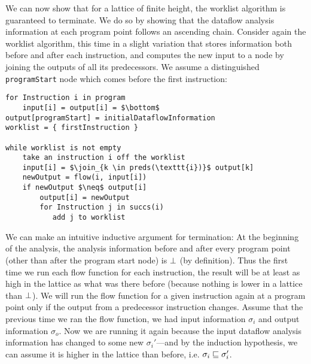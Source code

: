 \documentclass[11pt]{article}
\begin{document}


\vspace{1em}
We can now show that for a lattice of finite height, the worklist algorithm is guaranteed to terminate.  We do so by showing that the dataflow analysis information at each program point follows an ascending chain.  Consider again the worklist algorithm, this time in a slight
variation that stores information both before and after each instruction, and computes the new input to a node by joining the outputs of all its predecessors.  We assume a distinguished \texttt{programStart} node which comes before the first instruction:


\begin{lstlisting}[mathescape]
for Instruction i in program
    input[i] = output[i] = $\bottom$
output[programStart] = initialDataflowInformation
worklist = { firstInstruction }

while worklist is not empty
    take an instruction i off the worklist
    input[i] = $\join_{k \in preds(\texttt{i})}$ output[k]
    newOutput = flow(i, input[i])
    if newOutput $\neq$ output[i]
        output[i] = newOutput
        for Instruction j in succs(i)
           add j to worklist
\end{lstlisting}

We can make an intuitive inductive argument for termination:  At the beginning of the analysis, the analysis information before and after every program point (other than after the program start node) is $\bot$ (by definition).  Thus the first time we run each flow function for each instruction, the result will be at least as high in the lattice as what was there before (because nothing is lower in a lattice than $\bot$).  We will run the flow function for a given instruction again at a program point only if the output from a predecessor instruction changes.  Assume that the previous time we ran the flow function, we had input information $\sigma_i$ and output information $\sigma_o$.  Now we are running it again because the input dataflow analysis information has changed to some new $\sigma_i'$---and by the induction hypothesis, we can assume it is higher in the lattice than before, i.e. $\sigma_i \sqsubseteq \sigma_i'$.  
\end{document}
